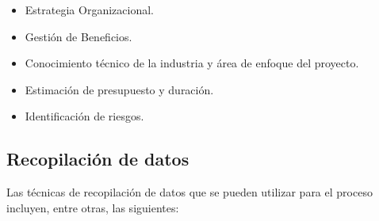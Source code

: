 \documentclass[letterpaper,12pt,openright,oneside]{article}
\theoremstyle{plain}
\begin{document}
\begin{itemize}
    \item Estrategia Organizacional.
    \item Gestión de Beneficios.
    \item Conocimiento técnico de la industria y área de enfoque del proyecto.
    \item Estimación de presupuesto y duración.
    \item Identificación de riesgos.
\end{itemize}
% 
% 
\subsection*{Recopilación de datos}

Las técnicas de recopilación de datos que se pueden utilizar para el proceso incluyen, entre otras, las siguientes:
\end{document}
